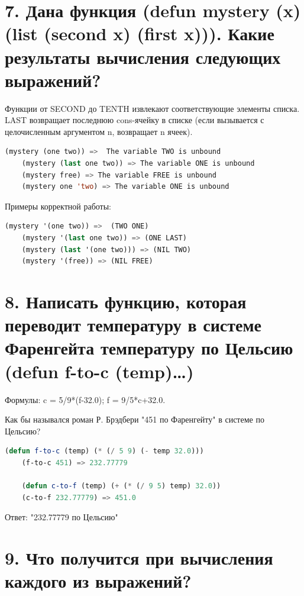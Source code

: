\documentclass[12pt]{report}
\begin{document}
\clearpage
\section*{7. Дана функция (defun mystery (x) (list (second x) (first x))). Какие результаты вычисления следующих выражений?}

Функции от SECOND до TENTH извлекают соответствующие элементы списка. LAST	возвращает последнюю cons-ячейку в списке (если вызывается с целочисленным аргументом n, возвращает n ячеек).

\begin{lstlisting}[language=Lisp]
	(mystery (one two)) =>  The variable TWO is unbound 
	(mystery (last one two)) => The variable ONE is unbound
	(mystery free) => The variable FREE is unbound
	(mystery one 'two) => The variable ONE is unbound
\end{lstlisting}

Примеры корректной работы:
\begin{lstlisting}[language=Lisp]
	(mystery '(one two)) =>  (TWO ONE)
	(mystery '(last one two)) => (ONE LAST)
	(mystery (last '(one two))) => (NIL TWO)
	(mystery '(free)) => (NIL FREE)
\end{lstlisting}

\section*{8. Написать функцию, которая переводит температуру в системе Фаренгейта температуру по Цельсию (defun f-to-c (temp)…)}

Формулы: c = 5/9*(f-32.0); f = 9/5*c+32.0. 

Как бы назывался роман Р. Брэдбери "451 по Фаренгейту" в системе по Цельсию?

\begin{lstlisting}[language=Lisp]
	(defun f-to-c (temp) (* (/ 5 9) (- temp 32.0)))
	(f-to-c 451) => 232.77779
	
	(defun c-to-f (temp) (+ (* (/ 9 5) temp) 32.0))
	(c-to-f 232.77779) => 451.0
\end{lstlisting}

Ответ: "232.77779 по Цельсию"



\clearpage
\section*{9. Что получится при вычисления каждого из выражений?}
\end{document}
